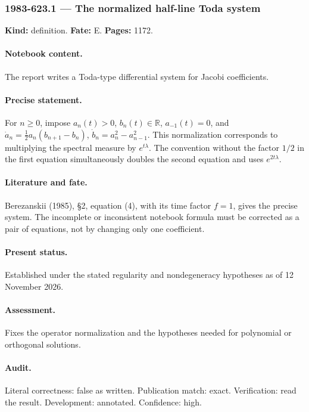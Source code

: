 \subsubsection{1983-623.1 --- The normalized half-line Toda system}

\label{item:1983-623.1}

\noindent\textbf{Kind:} definition. \textbf{Fate:} E. \textbf{Pages:} 1172.\par

\paragraph{Notebook content.} The report writes a Toda-type differential system for Jacobi coefficients.

\paragraph{Precise statement.} For \(n\ge0\), impose \(a_n(t)>0\), \(b_n(t)\in\mathbb R\), \(a_{-1}(t)=0\), and \(\dot a_n=\frac12a_n(b_{n+1}-b_n)\), \(\dot b_n=a_n^2-a_{n-1}^2\). This normalization corresponds to multiplying the spectral measure by \(e^{t\lambda}\). The convention without the factor \(1/2\) in the first equation simultaneously doubles the second equation and uses \(e^{2t\lambda}\).

\paragraph{Literature and fate.} Berezanskii (1985), \S2, equation (4), with its time factor \(f=1\), gives the precise system. The incomplete or inconsistent notebook formula must be corrected as a pair of equations, not by changing only one coefficient.

\paragraph{Present status.} Established under the stated regularity and nondegeneracy hypotheses as of 12 November 2026.

\paragraph{Assessment.} Fixes the operator normalization and the hypotheses needed for polynomial or orthogonal solutions.

\paragraph{Audit.} Literal correctness: false as written. Publication match: exact. Verification: read the result. Development: annotated. Confidence: high.

